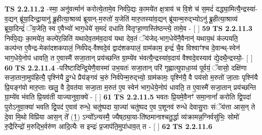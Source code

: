 \documentclass[17pt]{extarticle}
\begin{document}
                  \newline
                                \textbf{ TS 2.2.11.2} \newline
                  -स्मा॒ अनु॑वर्त्मानं करोत्ये॒तामे॒व निर्व॑पे॒द्यः का॒मये॑त क्ष॒त्राय॑ च वि॒शे च॑ स॒मदं॑ दद्ध्या॒मित्यै॒न्द्रस्या॑-व॒द्यन् ब्रू॑या॒दिन्द्रा॒यानु॑ ब्रू॒हीत्या॒श्राव्य॑ ब्रूयान्-म॒रुतो॑ य॒जेति॑ मारु॒तस्या॑व॒द्यन् ब्रू॑यान्म॒रुद्भ्योऽनु॑ ब्रू॒हीत्या॒श्राव्य॑ ब्रूया॒दिन्द्रं॑ ॅय॒जेति॒ स्व ए॒वैभ्यो॑ भाग॒धेये॑ स॒मदं॑ दधाति वितृꣳहा॒णास्ति॑ष्ठन्त्ये॒ तामे॒व - [  ] \textbf{  59} \newline
                  \newline
                                \textbf{ TS 2.2.11.3} \newline
                  निर्व॑पे॒द्यः का॒मये॑त॒ कल्पे॑र॒न्निति॑ यथादेव॒तम॑व॒दाय॑ यथा देव॒तं ॅय॑जेद्-भाग॒धेये॑नै॒वैनान्॑ यथाय॒थं क॑ल्पयति॒ कल्प॑न्त ए॒वैन्द्र-मेका॑दशकपालं॒ निर्व॑पेद्-वैश्वदे॒वं द्वाद॑शकपालं॒ ग्राम॑काम॒ इन्द्रं॑ चै॒व विश्वाꣳ॑श्च दे॒वान्थ्-स्वेन॑ भाग॒धेये॒नोप॑ धावति॒ त ए॒वास्मै॑ सजा॒तान् प्रय॑च्छन्ति ग्रा॒म्ये॑व भ॑वत्यै॒न्द्रस्या॑व॒दाय॑ वैश्वदे॒वस्याव॑ द्ये॒दथै॒न्द्रस्यो॒- [  ] \textbf{  60} \newline
                  \newline
                                \textbf{ TS 2.2.11.4} \newline
                  -परि॑ष्टादिन्द्रि॒येणै॒वास्मा॑ उभ॒यतः॑ सजा॒तान् परि॑ गृह्णात्युपाधा॒य्य॑ पूर्वयं॒ ॅवासो॒ दक्षि॑णा सजा॒ताना॒मुप॑हित्यै॒ पृश्नि॑यै दु॒ग्धे प्रैय॑ङ्गवं च॒रुं निर्व॑पेन्म॒रुद्भ्यो॒ ग्राम॑कामः॒ पृश्नि॑यै॒ वै पय॑सो म॒रुतो॑ जा॒ताः पृश्नि॑यै प्रि॒यङ्ग॑वो मारु॒ताः खलु॒ वै दे॒वत॑या सजा॒ता म॒रुत॑ ए॒व स्वेन॑ भाग॒धेये॒नोप॑ धावति॒ त ए॒वास्मै॑ सजा॒तान् प्रय॑च्छन्ति ग्रा॒म्ये॑व भ॑वति प्रि॒यव॑ती याज्यानुवा॒क्ये॑ - [  ] \textbf{  61} \newline
                  \newline
                                \textbf{ TS 2.2.11.5} \newline
                  भवतः प्रि॒यमे॒वैनꣳ॑ समा॒नानां᳚ करोति द्वि॒पदा॑ पुरोऽनुवा॒क्या॑ भवति द्वि॒पद॑ ए॒वाव॑ रुन्धे॒ चतु॑ष्पदा या॒ज्या॑ चतु॑ष्पद ए॒व प॒शूनव॑ रुन्धे देवासु॒राः संॅय॑त्ता आस॒न् ते दे॒वा मि॒थो विप्रि॑या आस॒न् ते᳚ (1॒) ऽन्यो᳚ऽन्यस्मै॒ ज्यैष्‌ठ्या॒या-ति॑ष्ठमानाश्चतु॒र्द्धा व्य॑क्रामन्न॒ग्निर्वसु॑भिः॒ सोमो॑ रु॒द्रैरिन्द्रो॑ म॒रुद्भि॒र्वरु॑ण आदि॒त्यैः स इन्द्रः॑ प्र॒जाप॑ति॒मुपा॑धाव॒त् त - [  ] \textbf{  62} \newline
                  \newline
                                \textbf{ TS 2.2.11.6} \newline
\end{document}

